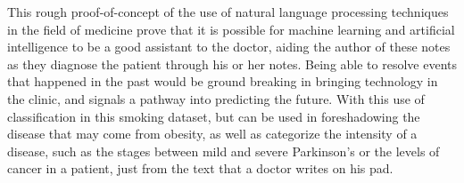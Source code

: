 \documentclass[12pt]{article}
\begin{document}
This rough proof-of-concept of the use of natural language processing techniques in the field of medicine prove that it is possible for machine learning and artificial intelligence to be a good assistant to the doctor, aiding the author of these notes as they diagnose the patient through his or her notes. Being able to resolve events that happened in the past would be ground breaking in bringing technology in the clinic, and signals a pathway into predicting the future. With this use of classification in this smoking dataset, but can be used in foreshadowing the disease that may come from obesity, as well as categorize the intensity of a disease, such as the stages between mild and severe Parkinson's or the levels of cancer in a patient, just from the text that a doctor writes on his pad.
\end{document}
